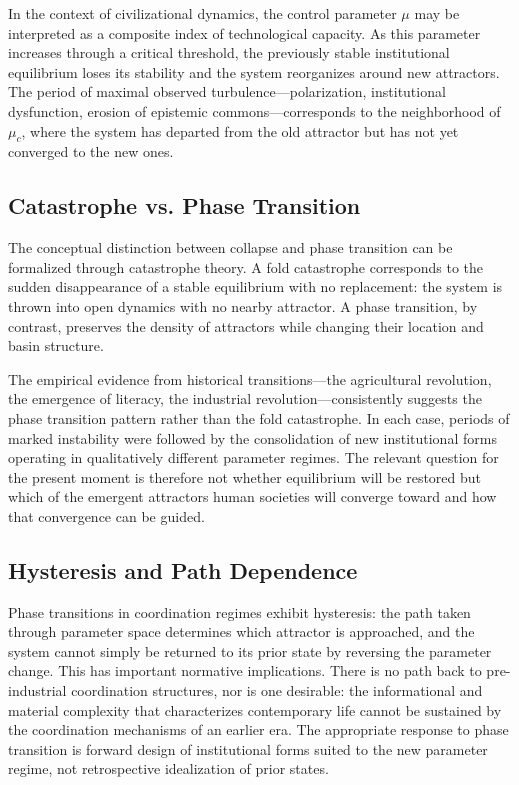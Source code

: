 \documentclass[12pt]{article}
\begin{document}
In the context of civilizational dynamics, the control parameter $\mu$ may be interpreted as a composite index of technological capacity. As this parameter increases through a critical threshold, the previously stable institutional equilibrium loses its stability and the system reorganizes around new attractors. The period of maximal observed turbulence---polarization, institutional dysfunction, erosion of epistemic commons---corresponds to the neighborhood of $\mu_c$, where the system has departed from the old attractor but has not yet converged to the new ones.

\subsection{Catastrophe vs. Phase Transition}

The conceptual distinction between collapse and phase transition can be formalized through catastrophe theory. A fold catastrophe corresponds to the sudden disappearance of a stable equilibrium with no replacement: the system is thrown into open dynamics with no nearby attractor. A phase transition, by contrast, preserves the density of attractors while changing their location and basin structure.

The empirical evidence from historical transitions---the agricultural revolution, the emergence of literacy, the industrial revolution---consistently suggests the phase transition pattern rather than the fold catastrophe. In each case, periods of marked instability were followed by the consolidation of new institutional forms operating in qualitatively different parameter regimes. The relevant question for the present moment is therefore not whether equilibrium will be restored but which of the emergent attractors human societies will converge toward and how that convergence can be guided.

\subsection{Hysteresis and Path Dependence}

Phase transitions in coordination regimes exhibit hysteresis: the path taken through parameter space determines which attractor is approached, and the system cannot simply be returned to its prior state by reversing the parameter change. This has important normative implications. There is no path back to pre-industrial coordination structures, nor is one desirable: the informational and material complexity that characterizes contemporary life cannot be sustained by the coordination mechanisms of an earlier era. The appropriate response to phase transition is forward design of institutional forms suited to the new parameter regime, not retrospective idealization of prior states.
\end{document}
